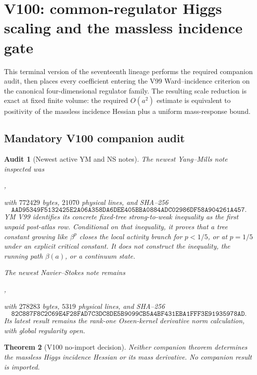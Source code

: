 \documentclass[11pt]{article}
\newtheorem{theorem}{Theorem}[section]
\newtheorem{audit}[theorem]{Audit}
\theoremstyle{remark}
\begin{document}
\section{V100: common-regulator Higgs scaling and the massless incidence gate}
\label{sec:v17v100}

This terminal version of the seventeenth lineage performs the required
companion audit, then places every coefficient entering the V99
Ward--incidence criterion on the canonical four-dimensional regulator
family.  The resulting scale reduction is exact at fixed finite
volume: the required \(O(a^2)\) estimate is equivalent to positivity of
the massless incidence Hessian plus a uniform mass-response bound.

\subsection{Mandatory V100 companion audit}

\begin{audit}[Newest active YM and NS notes]
\label{aud:v17v100-companions}
The newest Yang--Mills note inspected was
\begin{center}\footnotesize
{},
\end{center}
with \(772429\) bytes, \(21070\) physical lines, and SHA--256
\[
 \texttt{AAD95349F5132425E2A06A358DA6DEE405BBA0884ADC02986DF58A904261A457}.
\]
YM V99 identifies its concrete fixed-tree strong-to-weak inequality as
the first unpaid post-atlas row.  Conditional on that inequality, it
proves that a tree constant growing like \(\beta^p\) closes the local
activity branch for \(p<1/5\), or at \(p=1/5\) under an explicit
critical constant.  It does not construct the inequality, the running
path \(\beta(a)\), or a continuum state.

The newest Navier--Stokes note remains
\begin{center}\footnotesize
{},
\end{center}
with \(278283\) bytes, \(5319\) physical lines, and SHA--256
\[
 \texttt{82C887F8C2C69E4F28FAD7C3DC8DE5B9099CB5A4BF431EBA1FFF3E91935978AD}.
\]
Its latest result remains the rank-one Oseen-kernel derivative norm
calculation, with global regularity open.
\end{audit}

\begin{theorem}[V100 no-import decision]
\label{thm:v17v100-no-import}
Neither companion theorem determines the massless Higgs incidence
Hessian or its mass derivative.  No companion result is imported.
\end{theorem}
\end{document}
